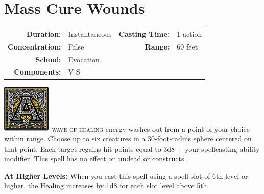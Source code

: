 \documentclass[12pt,showtrims]{memoir}
\begin{document}
\section*{Mass Cure Wounds}
{
\small\centering\vspace{-6pt}
\begin{tabular}{rlrl}
\toprule

\textbf{Duration:} & Instantaneous &
\textbf{Casting Time:} & 1 action \\
\textbf{Concentration:} & False &
\textbf{Range:} & 60 feet \\
\textbf{School:} & Evocation \\
\textbf{Components:} & \multicolumn{3}{p{0.7\textwidth}}{V S}\\

\bottomrule
\end{tabular}
}
\vspace{1\baselineskip}\noindent
\lettrine[lines=4]{\includegraphics[height=66pt]{initials/A.png}}{\ wave of healing} energy washes out from a point of your choice within range. Choose up to six creatures in a 30-foot-radius sphere centered on that point. Each target regains hit points equal to 3d8 + your spellcasting ability modifier. This spell has no effect on undead or constructs.

\vspace{8pt} \noindent\textbf{At Higher Levels:} When you cast this spell using a spell slot of 6th level or higher, the Healing increases by 1d8 for each slot level above 5th.

\newpage
\end{document}
